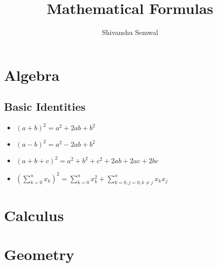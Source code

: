 \documentclass{article}
\title{Mathematical Formulas}
\author{Shivanshu Semwal}
\begin{document}
	\maketitle
	\newpage
		
	\tableofcontents
	\newpage
	
	\section{Algebra}
	
	\subsection{Basic Identities}
	
	\begin{itemize}
		
		\item \( (a+b)^2 = a^2 + 2ab + b^2\)
		\item \( (a-b)^2 = a^2 - 2ab + b^2\)
		\item \( (a+b+c)^2 = a^2 +b^2 +c^2 +2ab+2ac+2bc\)
		\item \( \displaystyle \left(\sum^{n}_{k=0} x_k \right)^2 = \sum^{n}_{k=0}x_k^2 + \sum^n_{k=0,j=0,k\neq j }x_k x_j\)
	\end{itemize}

	\newpage
	\section{Calculus}
	
	\newpage
	\section{Geometry}
	
\end{document}
